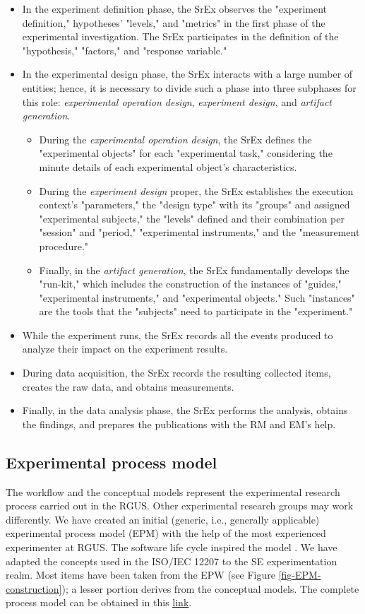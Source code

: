 \begin{itemize}
	\item In the experiment definition phase, the SrEx observes the "experiment definition," hypotheses' "levels," and "metrics" in the first phase of the experimental investigation. The SrEx participates in the definition of the "hypothesis," "factors," and  "response variable."
	\item In the experimental design phase, the SrEx interacts with a large number of entities; hence, it is necessary to divide such a phase into three subphases for this role: \textit{experimental operation design}, \textit{experiment design}, and \textit{artifact generation}.
    \begin{itemize}
	    \item During the \textit{experimental operation design}, the SrEx defines the "experimental objects" for each "experimental task," considering the minute details of each experimental object's characteristics.
	    \item During the \textit{experiment design} proper, the SrEx establishes the execution context's "parameters," the "design type" with its "groups" and assigned "experimental subjects," the "levels" defined and their combination per "session" and "period," "experimental instruments," and the "measurement procedure." 
        \item Finally, in the \textit{artifact generation}, the SrEx fundamentally develops the "run-kit," which includes the construction of the instances of "guides," "experimental instruments," and "experimental objects." Such "instances" are the tools that the "subjects" need to participate in the "experiment."
	\end{itemize}
	\item While the experiment runs, the SrEx records all the events produced to analyze their impact on the experiment results.
	\item During data acquisition, the SrEx records the resulting collected items, creates the raw data, and obtains measurements.
	\item Finally, in the data analysis phase, the SrEx performs the analysis, obtains the findings, and prepares the publications with the RM and EM's help.
\end{itemize}

\subsection{Experimental process model}
The workflow and the conceptual models represent the experimental research process carried out in the RGUS. Other experimental research groups may work differently. We have created an initial (generic, i.e., generally applicable) experimental process model (EPM) with the help of the most experienced experimenter at RGUS. The software life cycle inspired the model \cite{ISO-IEC-IEEE-12207}. We have adapted the concepts used in the ISO/IEC 12207 to the SE experimentation realm. Most items have been taken from the EPW (see Figure \ref{fig-EPM-construction}); a lesser portion derives from the conceptual models. The complete process model can be obtained in this \href{https://zenodo.org/record/7105096#.YyxoCOzMLUI}{\ul{link}}.

